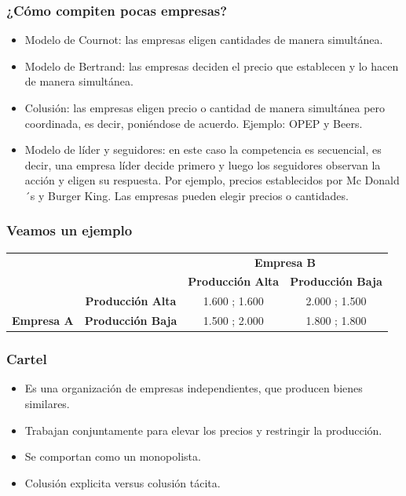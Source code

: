 \documentclass{beamer}
\begin{document}
\begin{frame}
\frametitle{¿Cómo compiten pocas empresas?}
\begin{itemize}
    \item Modelo de Cournot: las empresas eligen cantidades de manera simultánea. \vspace{2mm}
    \item Modelo de Bertrand: las empresas deciden el precio que establecen y lo hacen de manera simultánea.  \vspace{2mm}
    \item Colusión: las empresas eligen precio o cantidad de manera simultánea pero coordinada, es decir, poniéndose de acuerdo. Ejemplo: OPEP y Beers.
    \item Modelo de líder y seguidores: en este caso la competencia es secuencial, es decir, una empresa líder decide primero y luego los seguidores observan la acción y eligen su respuesta. Por ejemplo, precios establecidos por Mc Donald´s y Burger King. Las empresas pueden elegir precios o cantidades.
\end{itemize}
\end{frame}

\begin{frame}
\frametitle{Veamos un ejemplo}
\centering
\begin{table}
\begin{tabular}{|c|c|c|c|}
\hline
\multicolumn{2}{|c|}{}                                     & \multicolumn{2}{c|}{\textbf{Empresa B}}              \\ \cline{3-4} 
\multicolumn{2}{|c|}{\multirow{}{}{\textbf{}}}          & \textbf{Producción Alta}           & \textbf{Producción Baja} \\ \hline
                                   & \textbf{Producción Alta} & {\color[HTML]{000000} 1.600 ; 1.600} & 2.000 ; 1.500            \\ \cline{2-4} 
\multirow{}{}{\textbf{Empresa A}} & \textbf{Producción Baja}    & 1.500 ; 2.000                         & 1.800 ; 1.800           \\ \hline
\end{tabular}
\end{table}
\end{frame}


\begin{frame}
\frametitle{Cartel}
\begin{itemize}
    \item Es una organización de empresas independientes, que producen bienes similares.\vspace{4mm}
    \item Trabajan conjuntamente para elevar los precios y restringir la producción.\vspace{4mm}
    \item Se comportan como un monopolista.\vspace{4mm}
    \item Colusión explicita versus colusión tácita.\vspace{4mm}
    \end{itemize}
\end{frame}
\end{document}
